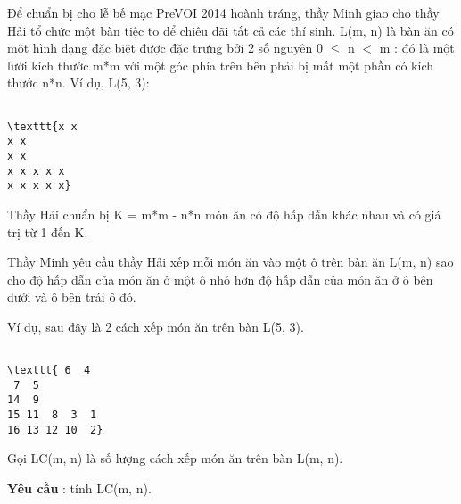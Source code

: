 Để chuẩn bị cho lễ bế mạc PreVOI 2014 hoành tráng, thầy Minh giao cho thầy Hải tổ chức một bàn tiệc to để chiêu đãi tất cả các thí sinh. L(m, n) là bàn ăn có một hình dạng đặc biệt được đặc trưng bởi 2 số nguyên 0  $\le$  n $<$ m : đó là một lưới kích thước m*m với một góc phía trên bên phải bị mất một phần có kích thước n*n. Ví dụ, L(5, 3):
\begin{verbatim}

\texttt{x x
x x
x x
x x x x x
x x x x x}\end{verbatim}

Thầy Hải chuẩn bị K = m*m - n*n món ăn có độ hấp dẫn khác nhau và có giá trị từ 1 đến K.

Thầy Minh yêu cầu thầy Hải xếp mỗi món ăn vào một ô trên bàn ăn L(m, n) sao cho độ hấp dẫn của món ăn ở một ô nhỏ hơn độ hấp dẫn của món ăn ở ô bên dưới và ô bên trái ô đó.

Ví dụ, sau đây là 2 cách xếp món ăn trên bàn L(5, 3).
\begin{verbatim}

\texttt{ 6  4
 7  5
14  9
15 11  8  3  1
16 13 12 10  2}\end{verbatim}

Gọi LC(m, n) là số lượng cách xếp món ăn trên bàn L(m, n).

\textbf{Yêu cầu } : tính LC(m, n).